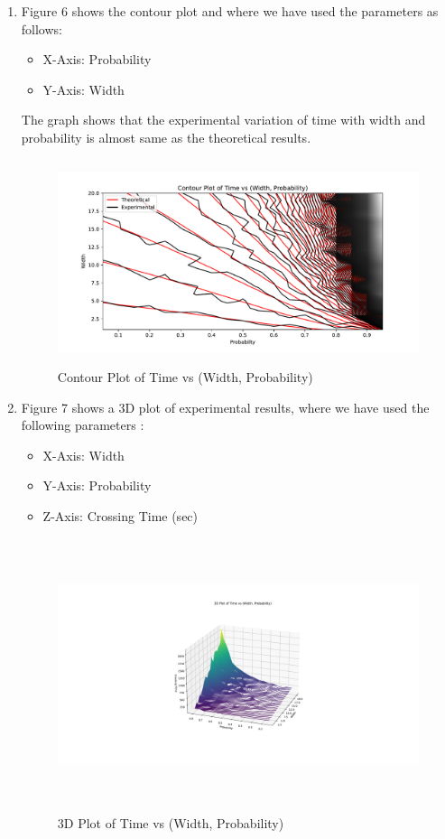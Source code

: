 \documentclass[12pt]{article}
\begin{document}
\begin{enumerate}
\item Figure 6 shows the contour plot and where we have used the parameters as follows:
   \begin{itemize}
        \item X-Axis: Probability
        \item Y-Axis: Width
   \end{itemize}

The graph shows that the experimental variation of time with width and probability is almost same as the theoretical results.
\begin{center}
    \begin{figure}[h]
        \centering
        \includegraphics[width=15cm, height=6cm]{contour.pdf}
        \caption{Contour Plot of Time vs (Width, Probability)}
    \end{figure}
\end{center}

\item Figure 7 shows a 3D plot of experimental results, where we have used the following parameters :
   \begin{itemize}
        \item X-Axis: Width
        \item Y-Axis: Probability
        \item Z-Axis: Crossing Time (sec)
   \end{itemize}

\begin{center}
    \begin{figure}[h]
        \centering
        \includegraphics[width=17cm, height=8cm]{3D.pdf}
        \caption{3D Plot of Time vs (Width, Probability)}
    \end{figure}
\end{center}

\end{enumerate}
\end{document}
